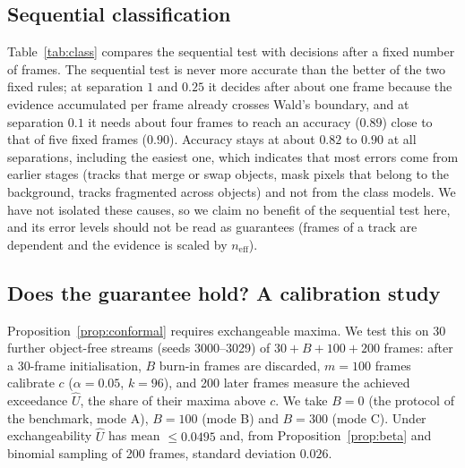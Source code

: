 \documentclass[11pt,a4paper]{article}
\theoremstyle{definition}
\begin{document}
\subsection{Sequential classification}\label{sec:sprt}
\begin{table}[t]
\centering\small
\resizebox{\textwidth}{!}{}
\caption{Class decisions per track on the held-out scenes. ``Acc.\ after $n$ frames'' is the accuracy of the class with the largest accumulated log-likelihood after $n$ frames of the track; SPRT is Wald's test with levels $0.01$. Tracks are matched to the true object they overlap most frames.}
\label{tab:class}
\end{table}
Table~\ref{tab:class} compares the sequential test with decisions after a fixed number of frames.
The sequential test is never more accurate than the better of the two fixed rules; at separation $1$ and $0.25$ it decides after about one frame because the evidence accumulated per frame already crosses Wald's boundary, and at separation $0.1$ it needs about four frames to reach an accuracy ($0.89$) close to that of five fixed frames ($0.90$).
Accuracy stays at about $0.82$ to $0.90$ at all separations, including the easiest one, which indicates that most errors come from earlier stages (tracks that merge or swap objects, mask pixels that belong to the background, tracks fragmented across objects) and not from the class models.
We have not isolated these causes, so we claim no benefit of the sequential test here, and its error levels should not be read as guarantees (frames of a track are dependent and the evidence is scaled by $n_{\mathrm{eff}}$).

\subsection{Does the guarantee hold? A calibration study}\label{sec:calstudy}
Proposition~\ref{prop:conformal} requires exchangeable maxima. We test this on 30 further object-free streams (seeds 3000--3029) of $30+B+100+200$ frames: after a 30-frame initialisation, $B$ burn-in frames are discarded, $m=100$ frames calibrate $c$ ($\alpha=0.05$, $k=96$), and 200 later frames measure the achieved exceedance $\widehat U$, the share of their maxima above $c$. We take $B=0$ (the protocol of the benchmark, mode A), $B=100$ (mode B) and $B=300$ (mode C).
Under exchangeability $\widehat U$ has mean $\le0.0495$ and, from Proposition~\ref{prop:beta} and binomial sampling of 200 frames, standard deviation $0.026$.
\end{document}
